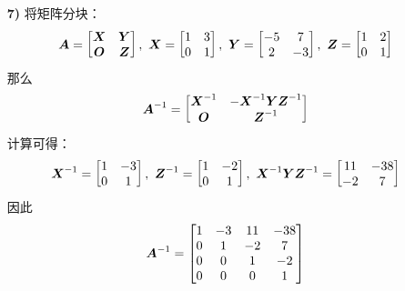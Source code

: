 \begin{problem}
\begin{solution}
\begin{enumerate}
			\item[\textbf{7)}] 将矩阵分块：
			$$
			\boldsymbol{A} = \begin{bmatrix}
				\boldsymbol{X} & \boldsymbol{Y} \\
				\boldsymbol{O} & \boldsymbol{Z}
			\end{bmatrix},\ \boldsymbol{X} = \begin{bmatrix}
				1 & 3 \\
				0 & 1
			\end{bmatrix},\ \boldsymbol{Y} = \begin{bmatrix}
				-5 & 7 \\
				2 & -3
			\end{bmatrix},\ \boldsymbol{Z} = \begin{bmatrix}
				1 & 2 \\
				0 & 1
			\end{bmatrix}
			$$
			那么
			$$
			\boldsymbol{A}^{-1} = \begin{bmatrix}
				\boldsymbol{X}^{-1} & -\boldsymbol{X}^{-1} \boldsymbol{Y} \boldsymbol{Z}^{-1} \\
				\boldsymbol{O} & \boldsymbol{Z}^{-1}
			\end{bmatrix}
			$$
			计算可得：
			$$
			\boldsymbol{X}^{-1} = \begin{bmatrix}
				1 & -3 \\
				0 & 1
			\end{bmatrix},\ \boldsymbol{Z}^{-1} = \begin{bmatrix}
				1 & -2 \\
				0 & 1
			\end{bmatrix},\ \boldsymbol{X}^{-1} \boldsymbol{Y} \boldsymbol{Z}^{-1} = \begin{bmatrix}
				11 & -38 \\
				-2 & 7
			\end{bmatrix}
			$$
			因此
			$$
			\boldsymbol{A}^{-1} = \begin{bmatrix}
				1 & -3 & 11 & -38 \\
				0 & 1 & -2 & 7 \\
				0 & 0 & 1 & -2 \\
				0 & 0 & 0 & 1
			\end{bmatrix}
			$$
		\end{enumerate}
	\end{solution}
\end{problem}

